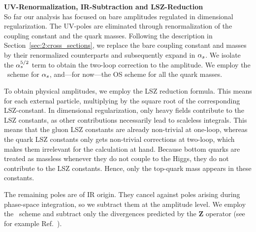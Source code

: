 \textbf{\acs{UV}-Renormalization, \acs{IR}-Subtraction and LSZ-Reduction} \\
So far our analysis has focused on bare amplitudes regulated in dimensional regularization. The \acs{UV}-poles are eliminated through renormalization of the coupling constant and the quark masses. Following the description in Section~\ref{sec:2:cross_sections}, we replace the bare coupling constant and masses by their renormalized counterparts and subsequently expand in $\alpha_s$. We isolate the $\alpha_s^{5/2}$ term to obtain the two-loop correction to the amplitude. We employ the \MS\ scheme for $\alpha_s$, and---for now---the OS scheme for all the quark masses.

To obtain physical amplitudes, we employ the LSZ reduction formula. This means for each external particle, multiplying by the square root of the corresponding LSZ-constant. In dimensional regularization, only heavy fields contribute to the LSZ constants, as other contributions necessarily lead to scaleless integrals. This means that the gluon LSZ constants are already non-trivial at one-loop, whereas the quark LSZ constants only gets non-trivial corrections at two-loop, which makes them irrelevant for the calculation at hand. Because bottom quarks are treated as massless whenever they do not couple to the Higgs, they do not contribute to the LSZ constants. Hence, only the top-quark mass appears in these constants.

The remaining poles are of \acs{IR} origin. They cancel against poles arising during phase-space integration, so we subtract them at the amplitude level. We employ the \MS\ scheme and subtract only the divergences predicted by the $\mathbf{Z}$ operator (see for example Ref.~\cite{Czakon:2014oma}).

